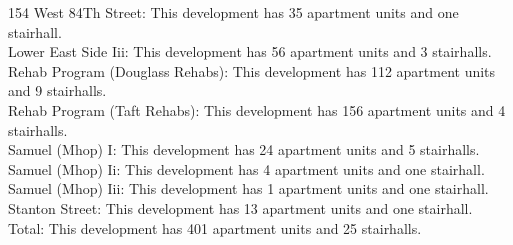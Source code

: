 {154 West 84Th Street}: This development has 35 apartment units and one stairhall.\\{Lower East Side Iii}: This development has 56 apartment units and 3 stairhalls.\\{Rehab Program (Douglass Rehabs)}: This development has 112 apartment units and 9 stairhalls.\\{Rehab Program (Taft Rehabs)}: This development has 156 apartment units and 4 stairhalls.\\{Samuel (Mhop) I}: This development has 24 apartment units and 5 stairhalls.\\{Samuel (Mhop) Ii}: This development has 4 apartment units and one stairhall.\\{Samuel (Mhop) Iii}: This development has 1 apartment units and one stairhall.\\{Stanton Street}: This development has 13 apartment units and one stairhall.\\{Total}: This development has 401 apartment units and 25 stairhalls.\\